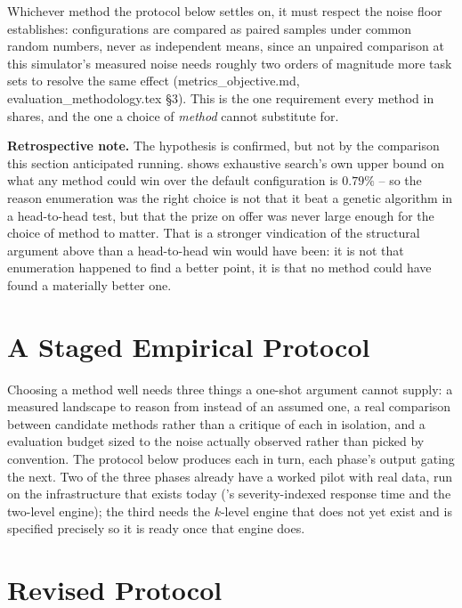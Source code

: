 Whichever method the protocol below settles on, it must respect the noise
floor  establishes: configurations are compared as paired
samples under common random numbers, never as independent means, since an
unpaired comparison at this simulator's measured noise needs roughly two
orders of magnitude more task sets to resolve the same effect
(metrics\_objective.md, evaluation\_methodology.tex \S3). This is the one
requirement every method in  shares, and the one a
choice of \emph{method} cannot substitute for.

\textbf{Retrospective note.} The hypothesis is confirmed, but not by the
comparison this section anticipated running. 
shows exhaustive search's own upper bound on what any method could win over
the default configuration is $0.79\%$ -- so the reason enumeration was the
right choice is not that it beat a genetic algorithm in a head-to-head test,
but that the prize on offer was never large enough for the choice of method to
matter. That is a stronger vindication of the structural argument above than a
head-to-head win would have been: it is not that enumeration happened to find
a better point, it is that no method could have found a materially better one.

\section{A Staged Empirical Protocol}
\label{sec:protocol}

Choosing a method well needs three things a one-shot argument cannot supply:
a measured landscape to reason from instead of an assumed one, a real
comparison between candidate methods rather than a critique of each in
isolation, and a evaluation budget sized to the noise actually observed
rather than picked by convention. The protocol below produces each in turn,
each phase's output gating the next. Two of the three phases already have a
worked pilot with real data, run on the infrastructure that exists today
('s severity-indexed response time and the two-level
engine); the third needs the $k$-level engine that does not yet exist and is
specified precisely so it is ready once that engine does.

\section{Revised Protocol}
\label{sec:revised-protocol}


